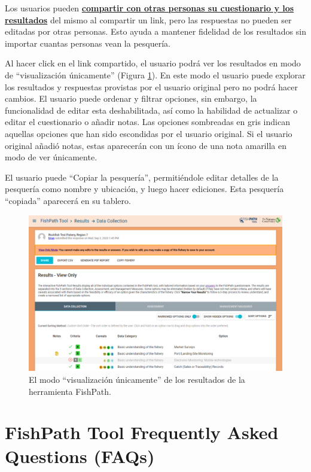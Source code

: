 \documentclass[
  11pt,
]{book}
\begin{document}
Los usuarios pueden \protect\hyperlink{Results-Actions}{\textbf{compartir con otras personas su cuestionario y los resultados}} del mismo al compartir un link, pero las respuestas no pueden ser editadas por otras personas. Esto ayuda a mantener fidelidad de los resultados sin importar cuantas personas vean la pesquería.

Al hacer click en el link compartido, el usuario podrá ver los resultados en modo de ``visualización únicamente'' (Figura \ref{fig:view-only}). En este modo el usuario puede explorar los resultados y respuestas provistas por el usuario original pero no podrá hacer cambios. El usuario puede ordenar y filtrar opciones, sin embargo, la funcionalidad de editar esta deshabilitada, así como la habilidad de actualizar o editar el cuestionario o añadir notas. Las opciones sombreadas en gris indican aquellas opciones que han sido escondidas por el usuario original. Si el usuario original añadió notas, estas aparecerán con un ícono de una nota amarilla en modo de ver únicamente.

El usuario puede ``Copiar la pesquería'', permitiéndole editar detalles de la pesquería como nombre y ubicación, y luego hacer ediciones. Esta pesquería ``copiada'' aparecerá en su tablero.

\begin{figure}

{\centering \includegraphics[width=0.95\linewidth]{images/view-only} 

}

\caption{El modo “visualización únicamente” de los resultados de la herramienta FishPath.}\label{fig:view-only}
\end{figure}

\hypertarget{appendix-appendix}{%
\appendix}


\hypertarget{fishpath-tool-frequently-asked-questions-faqs}{%
\chapter{FishPath Tool Frequently Asked Questions (FAQs)}\label{fishpath-tool-frequently-asked-questions-faqs}}
\end{document}
